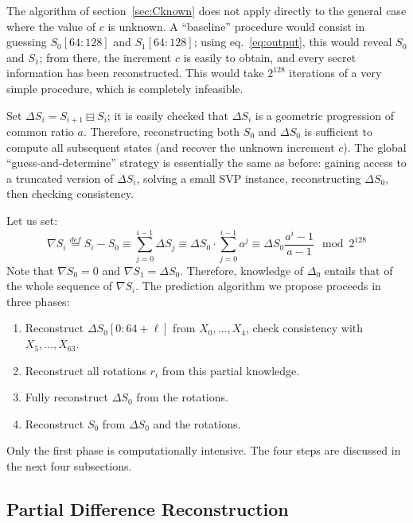 \documentclass[submission,svgnames,journal=tosc]{iacrtrans}
\begin{document}
The algorithm of section~\ref{sec:Cknown} does not apply directly to the general
case where the value of $c$ is unknown. A ``baseline'' procedure would consist
in guessing $S_0[64:128]$ and $S_1[64:128]$; using eq.~\eqref{eq:output}, this
would reveal $S_0$ and $S_1$; from there, the increment $c$ is easily to obtain,
and every secret information has been reconstructed. This would take $2^{128}$
iterations of a very simple procedure, which is completely infeasible.

Set $\Delta S_i = S_{i+1} \boxminus S_i$; it is easily checked that $\Delta S_i$ is a
geometric progression of common ratio $a$. Therefore, reconstructing both $S_0$
and $\Delta S_0$ is sufficient to compute all subsequent states (and recover the
unknown increment $c$). The global ``guess-and-determine'' strategy is
essentially the same as before: gaining access to a truncated version of
$\Delta S_i$, solving a small SVP instance, reconstructing $\Delta S_0$, then
checking consistency.

Let us set:
\begin{equation}\label{eq:nabla}
  \nabla S_i \stackrel{def}{=} S_i - S_0 \equiv \sum_{j=0}^{i-1} \Delta S_j \equiv \Delta S_0 \cdot \sum_{j=0}^{i-1} a^j \equiv \Delta S_0 \frac{a^i-1}{a-1} \mod 2^{128}
\end{equation}
Note that $\nabla S_0 = 0$ and $\nabla S_1 = \Delta S_0$. Therefore, knowledge
of $\Delta_0$ entails that of the whole sequence of $\nabla S_i$. The prediction
algorithm we propose proceeds in three phases:
\begin{enumerate}
\item Reconstruct $\Delta S_0[0:64+\ell]$ from $X_0, \dots, X_{4}$, check consistency with $X_5, \dots, X_{63}$.
\item Reconstruct all rotations $r_i$ from this partial knowledge.
\item Fully reconstruct $\Delta S_0$ from the rotations.
\item Reconstruct $S_0$ from $\Delta S_0$ and the rotations.
\end{enumerate}

\noindent Only the first phase is computationally intensive. The four steps are discussed in the next four subsections.

\subsection{Partial Difference Reconstruction}
\label{sec:cvp_small_2}
\end{document}
